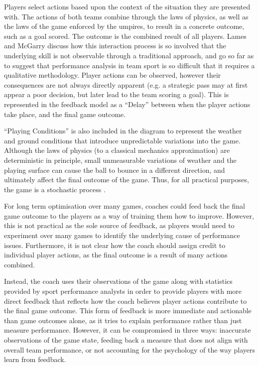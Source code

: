 Players select actions based upon the context of the situation they are
presented with. The actions of both teams combine through the laws of
physics, as well as the laws of the game enforced by the umpires, to
result in a concrete outcome, such as a goal scored. The outcome is the
combined result of all players. Lames and
McGarry \cite{lames2007search} discuss how this interaction process is so involved that the
underlying skill is not observable through a traditional approach, and
go so far as to suggest that performance analysis in team sport is so
difficult that it requires a qualitative methodology. Player actions can be observed, however their consequences are not always directly apparent (e.g. a strategic pass may at first appear a poor decision, but later lead to the team scoring a goal). This is represented in the feedback model as a ``Delay'' between when the player actions take place, and the final game outcome.

``Playing Conditions'' is also included in the diagram to represent
the weather and ground conditions that introduce unpredictable
variations into the game. Although the laws of physics (to a classical
mechanics approximation) are deterministic in principle, small
unmeasurable variations of weather and the playing surface can cause the
ball to bounce in a different direction, and ultimately affect the final
outcome of the game. Thus, for all practical purposes, the
game is a stochastic process \cite{Forbes2006}.

For long term optimisation over many games, coaches could feed back the
final game outcome to the players as a way of training them how to
improve. However, this is not practical as the sole source of feedback, as players would
need to experiment over many games to identify the underlying cause of performance issues. Furthermore, it is not clear
how the coach should assign credit to individual player actions, as the
final outcome is a result of many actions combined.

Instead, the coach uses their observations of the game along with statistics provided by sport performance analysts in order to provide players with more direct feedback that reflects how the coach believes player actions
contribute to the final game outcome. This form of feedback is more immediate and actionable than game outcomes alone, as it tries to explain performance rather than just measure performance. However, it can be compromised in three ways: inaccurate observations of the game state, feeding back a measure that does not align with overall team
performance, or not accounting for the psychology of the way players
learn from feedback.

